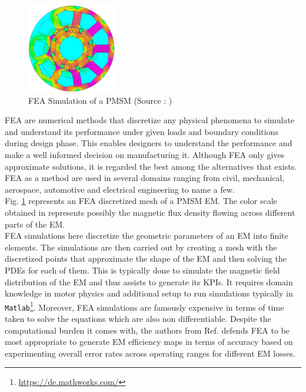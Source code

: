 \documentclass{report} %
\begin{document}
\begin{figure}[H]
    \centering
    \includegraphics[width=0.35\textwidth]{./ReportImages/FEA.png} 
    \caption{\ac{FEA} Simulation of a \ac{PMSM} (Source : \cite{CNNFEA-2020})}
    \label{fig:FEA Simulation of a PMSM}
\end{figure}

\ac{FEA} are numerical methods that discretize any physical phenomena to simulate and understand its performance under given loads and boundary conditions during design 
phase. This enables designers to understand the performance and make a well informed decision on manufacturing it. Although \ac{FEA} only gives approximate solutions, 
it is regarded the best among the alternatives that exists.
\ac{FEA} as a method are used in several domains ranging from civil, mechanical, aerospace, automotive and electrical engineering to name a few.\\

Fig. \ref{fig:FEA Simulation of a PMSM} represents an \ac{FEA} discretized mesh of a \ac{PMSM} \ac{EM}.
The color scale obtained in  represents possibly the magnetic flux density flowing across different parts of the \ac{EM}.\\
\ac{FEA} simulations here discretize the geometric parameters of an \ac{EM} into finite elements.
The simulations are then carried out by creating a mesh with the discretized points that approximate the shape of the \ac{EM} and then solving the \ac{PDE}s for each of them.
This is typically done to simulate the magnetic field distribution of the \ac{EM} and thus assists to generate its \ac{KPI}s.  
It requires domain knowledge in motor physics and additional setup to run simulations typically in \texttt{Matlab}\footnote{\url{https://de.mathworks.com/}}.
Moreover, \ac{FEA} simulations are famously expensive in terms of time taken to solve the equations which are also non differentiable.
Despite the computational burden it comes with, the authors from Ref. \cite{FEA-ETA-2017} defends \ac{FEA} to be most appropriate to 
generate \ac{EM} efficiency maps in terms of accuracy based on experimenting overall error rates across operating ranges for different \ac{EM} losses.\\
\end{document}

